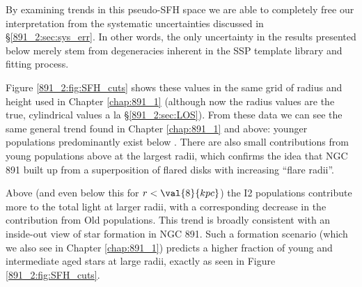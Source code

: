By examining trends in this pseudo-SFH space we are able to completely
free our interpretation from the systematic uncertainties discussed in
\S\ref{891_2:sec:sys_err}. In other words, the only uncertainty in the
results presented below merely stem from degeneracies inherent in the
SSP template library and fitting process.

Figure \ref{891_2:fig:SFH_cuts} shows these values in the same grid of
radius and height used in Chapter \ref{chap:891_1} (although now the
radius values are the true, cylindrical values a la
\S\ref{891_2:sec:LOS}). From these data we can see the same general
trend found in Chapter \ref{chap:891_1} and above: younger populations
predominantly exist below . There are also small
contributions from young populations above  at the
largest radii, which confirms the idea that NGC 891 built up from a
superposition of flared disks with increasing ``flare radii''.

Above  (and even below this for $r < \val{8}{kpc}$) the
I2 populations contribute more to the total light at larger radii,
with a corresponding decrease in the contribution from Old
populations. This trend is broadly consistent with an inside-out view
of star formation in NGC 891. Such a formation scenario (which we also
see in Chapter \ref{chap:891_1}) predicts a higher fraction of young
and intermediate aged stars at large radii, exactly as seen in Figure
\ref{891_2:fig:SFH_cuts}.





